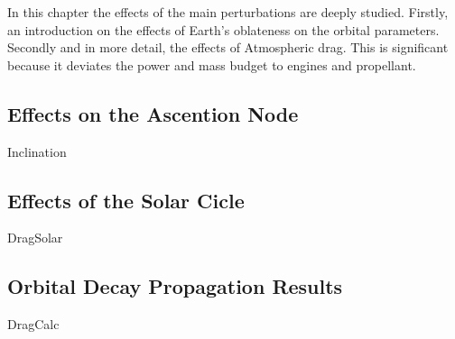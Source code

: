In this chapter the effects of the main perturbations are deeply studied. Firstly, an introduction on the effects of Earth's oblateness on the orbital parameters. Secondly and in more detail, the effects of Atmospheric drag. This is significant because it deviates the power and mass budget to engines and propellant.

\subsection{Effects on the Ascention Node}
{Inclination}

\subsection{Effects of the Solar Cicle}
{DragSolar}

\subsection{Orbital Decay Propagation Results}
{DragCalc}


